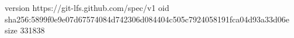 version https://git-lfs.github.com/spec/v1
oid sha256:5899f0e9e07d67574084d742306d084404c505c7924058191fca04d93a33d06e
size 331838
